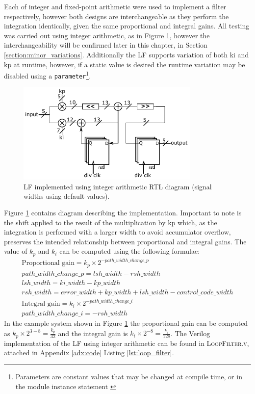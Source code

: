 Each of integer and fixed-point arithmetic were used to implement a filter respectively, however both designs are interchangeable as they perform the integration identically, given the same proportional and integral gains. All testing was carried out using integer arithmetic, as in Figure \ref{fig:integer_lf}, however the interchangeability will be confirmed later in this chapter, in Section \ref{section:minor_variations}. Additionally the \ac{LF} supports variation of both \acs{ki} and \acs{kp} at runtime, however, if a static value is desired the runtime variation may be disabled using a \texttt{parameter}\footnote{Parameters are constant values that may be changed at compile time, or in the module instance statement \cite{hdlworks2}}.
\begin{figure}[h]%
    \centering
    \includegraphics[width=0.8\textwidth]{../integer_lf} 
    \caption[\acl{LF} implemented using integer arithmetic \ac{RTL} diagram]{\acl{LF} implemented using integer arithmetic \ac{RTL} diagram (signal widths using default values).}
    \label{fig:integer_lf}
\end{figure}

Figure \ref{fig:integer_lf} contains  diagram describing the implementation. Important to note is the shift applied to the result of the multiplication by \acs{kp} which, as the integration is performed with a larger width to avoid accumulator overflow, preserves the intended relationship between proportional and integral gains. The value of $k_p$ and $k_i$ can be computed using the following formulae:
\begin{gather}
\text{Proportional gain} = k_p\times 2^{-path\_width\_change\_p} \\
path\_width\_change\_p = lsh\_width - rsh\_width \\
lsh\_width = ki\_width - kp\_width  \\
rsh\_width = error\_width + kp\_width + lsh\_width - control\_code\_width \\
\text{Integral gain} = k_i\times 2^{-path\_width\_change\_i} \\
path\_width\_change\_i = - rsh\_width
\end{gather}
In the example system shown in Figure \ref{fig:integer_lf} the proportional gain can be computed as $k_p\times 2^{3-8} = \frac{k_p}{32}$ and the integral gain is $k_i\times 2^{-8} = \frac{k_i}{128}$.
The Verilog implementation of the \ac{LF} using integer arithmetic can be found in \textsc{LoopFilter.v}, attached in Appendix \ref{adx:code} Listing \ref{lst:loop_filter}.

